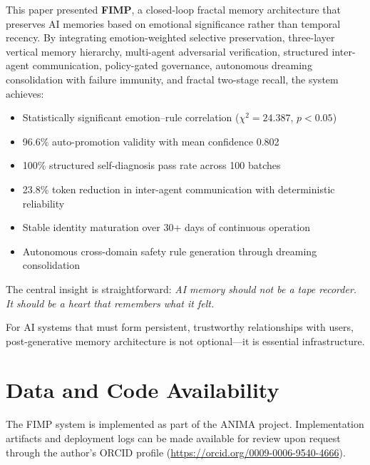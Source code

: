 \documentclass[11pt,a4paper]{article}
\begin{document}
This paper presented \textbf{FIMP}, a closed-loop fractal memory architecture that preserves AI memories based on emotional significance rather than temporal recency. By integrating emotion-weighted selective preservation, three-layer vertical memory hierarchy, multi-agent adversarial verification, structured inter-agent communication, policy-gated governance, autonomous dreaming consolidation with failure immunity, and fractal two-stage recall, the system achieves:

\begin{itemize}[itemsep=2pt]
  \item Statistically significant emotion--rule correlation ($\chi^2 = 24.387$, $p < 0.05$)
  \item 96.6\% auto-promotion validity with mean confidence 0.802
  \item 100\% structured self-diagnosis pass rate across 100 batches
  \item 23.8\% token reduction in inter-agent communication with deterministic reliability
  \item Stable identity maturation over 30+ days of continuous operation
  \item Autonomous cross-domain safety rule generation through dreaming consolidation
\end{itemize}

The central insight is straightforward: \emph{AI memory should not be a tape recorder. It should be a heart that remembers what it felt.}

For AI systems that must form persistent, trustworthy relationships with users, post-generative memory architecture is not optional---it is essential infrastructure.

\section*{Data and Code Availability}

The FIMP system is implemented as part of the ANIMA project. Implementation artifacts and deployment logs can be made available for review upon request through the author's ORCID profile (\url{https://orcid.org/0009-0006-9540-4666}).
\end{document}
